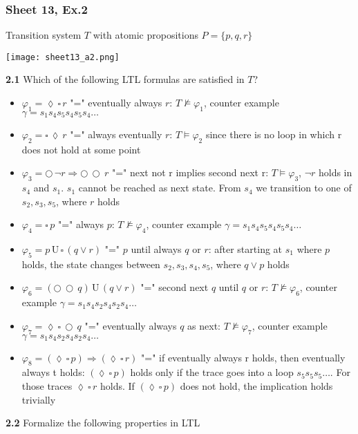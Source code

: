 \documentclass{article}
\def\unt{\, \text{U} \,}
\def\nex{\bigcirc \,}
\def\evt{\lozenge  \,}
\def\alw{\square \,}
\begin{document}
\subsubsection{Sheet 13, Ex.2}
Transition system $T$  with atomic propositions $P=\{p,q,r\}$
\begin{center}
\texttt{[image: sheet13\_a2.png]}
\end{center}
\textbf{2.1} Which of the following LTL formulas are satisfied in $T$?
\begin{itemize}
    \item $\varphi_1 = \evt \alw r$ "=" eventually always $r$: $T \nvDash \varphi_1$, counter example $\gamma = s_1s_4s_5s_4s_5s_4\dots$
    \item $\varphi_2 = \alw \evt r$ "=" always eventually $r$: $T \vDash \varphi_2$ since there is no loop in which r does not hold at some point 
    \item $\varphi_3 = \nex \lnot r \Rightarrow \nex \nex r$ "=" next not r implies second next r: $T \vDash \varphi_3$, $\lnot r$ holds in $s_4$ and $s_1$. $s_1$ cannot be reached as next state. From $s_4$ we transition to one of $s_2, s_3, s_5$, where $r$ holds
    \item $\varphi_4 = \alw p$ "=" always $p$: $T \nvDash \varphi_4$, counter example $\gamma = s_1s_4s_5s_4s_5s_4\dots$
    \item $\varphi_5 = p \unt \alw (q \lor r)$ "=" $p$ until always $q$ or $r$: after starting at $s_1$ where $p$ holds, the state changes between $s_2,s_3,s_4,s_5$, where $q \lor p$ holds 
    \item $\varphi_6 = (\nex \nex q) \unt (q \lor r)$ "=" second next $q$ until $q$ or $r$: $T \nvDash \varphi_6$, counter example $\gamma = s_1s_4s_2s_4s_2s_4\dots$
    \item $\varphi_7 = \evt \alw \nex q$ "=" eventually always $q$ as next: $T \nvDash \varphi_7$, counter example $\gamma = s_1s_4s_2s_4s_2s_4\dots$
    \item $\varphi_8 = (\evt \alw p) \Rightarrow  (\evt \alw r)$ "=" if eventually always r holds, then eventually always t holds: $(\evt \alw p)$ holds only if the trace goes into a loop $s_5s_5s_5\dots$. For those traces $\evt \alw r$ holds. If $(\evt \alw p)$ does not hold, the implication holds trivially
\end{itemize}
\textbf{2.2} Formalize the following properties in LTL
\end{document}
